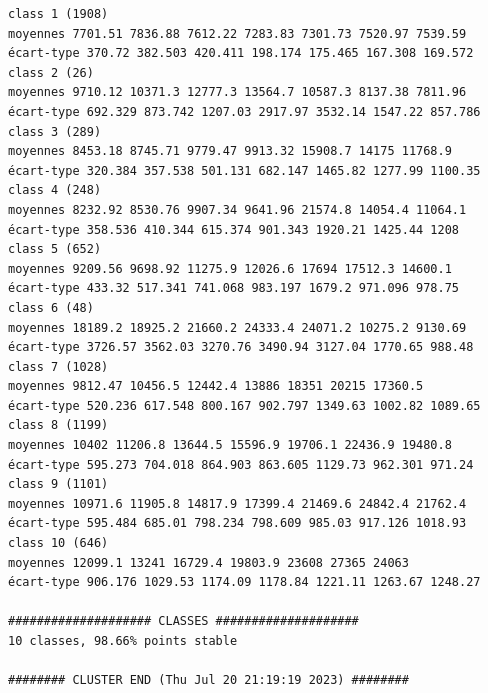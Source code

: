 \documentclass[environments,article,submit,pdftex,moreauthors]{Definitions/mdpi}
\begin{document}
\begin{scriptsize}
\begin{verbatim}
class 1 (1908)
moyennes 7701.51 7836.88 7612.22 7283.83 7301.73 7520.97 7539.59
écart-type 370.72 382.503 420.411 198.174 175.465 167.308 169.572
class 2 (26)
moyennes 9710.12 10371.3 12777.3 13564.7 10587.3 8137.38 7811.96
écart-type 692.329 873.742 1207.03 2917.97 3532.14 1547.22 857.786
class 3 (289)
moyennes 8453.18 8745.71 9779.47 9913.32 15908.7 14175 11768.9
écart-type 320.384 357.538 501.131 682.147 1465.82 1277.99 1100.35
class 4 (248)
moyennes 8232.92 8530.76 9907.34 9641.96 21574.8 14054.4 11064.1
écart-type 358.536 410.344 615.374 901.343 1920.21 1425.44 1208
class 5 (652)
moyennes 9209.56 9698.92 11275.9 12026.6 17694 17512.3 14600.1
écart-type 433.32 517.341 741.068 983.197 1679.2 971.096 978.75
class 6 (48)
moyennes 18189.2 18925.2 21660.2 24333.4 24071.2 10275.2 9130.69
écart-type 3726.57 3562.03 3270.76 3490.94 3127.04 1770.65 988.48
class 7 (1028)
moyennes 9812.47 10456.5 12442.4 13886 18351 20215 17360.5
écart-type 520.236 617.548 800.167 902.797 1349.63 1002.82 1089.65
class 8 (1199)
moyennes 10402 11206.8 13644.5 15596.9 19706.1 22436.9 19480.8
écart-type 595.273 704.018 864.903 863.605 1129.73 962.301 971.24
class 9 (1101)
moyennes 10971.6 11905.8 14817.9 17399.4 21469.6 24842.4 21762.4
écart-type 595.484 685.01 798.234 798.609 985.03 917.126 1018.93
class 10 (646)
moyennes 12099.1 13241 16729.4 19803.9 23608 27365 24063
écart-type 906.176 1029.53 1174.09 1178.84 1221.11 1263.67 1248.27

#################### CLASSES ####################
10 classes, 98.66% points stable

######## CLUSTER END (Thu Jul 20 21:19:19 2023) ########
\end{verbatim}
\end{scriptsize}
\end{document}
